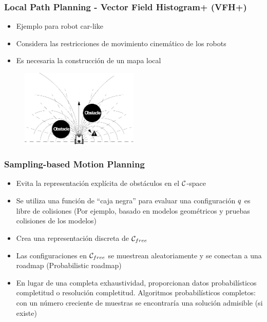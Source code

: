 \begin{frame}
	\frametitle{Local Path Planning - Vector Field Histogram+ (VFH+)}
	
	\begin{itemize}
		\item Ejemplo para robot car-like
		\item Considera las restricciones de movimiento cinemático de los robots
		\item Es necesaria la construcción de un mapa local
	\end{itemize}
	
	\begin{figure}
		\includegraphics[width=0.5\textwidth]{images/vfh_plus.pdf}
	\end{figure}
	
\end{frame}

\begin{frame}
	\frametitle{Sampling-based Motion Planning}
	
	\begin{itemize}
		\item Evita la representación explícita de obstáculos en el $\mathcal{C}$-space
        \item Se utiliza una función de ``caja negra'' para evaluar una configuración $q$
		es libre de colisiones (Por ejemplo, basado en modelos geométricos y pruebas
		colisiones de los modelos)
		\item Crea una representación discreta de $\mathcal{C}_{free}$
		\item Las configuraciones en $\mathcal{C}_{free}$ se muestrean aleatoriamente y se conectan
		a una roadmap (Probabilistic roadmap)
		\item En lugar de una completa exhaustividad, proporcionan datos probabilísticos completitud o resolución completitud. Algoritmos probabilísticos completos: con un número creciente de muestras se encontraría una solución admisible (si existe)
	\end{itemize}
	
\end{frame}

